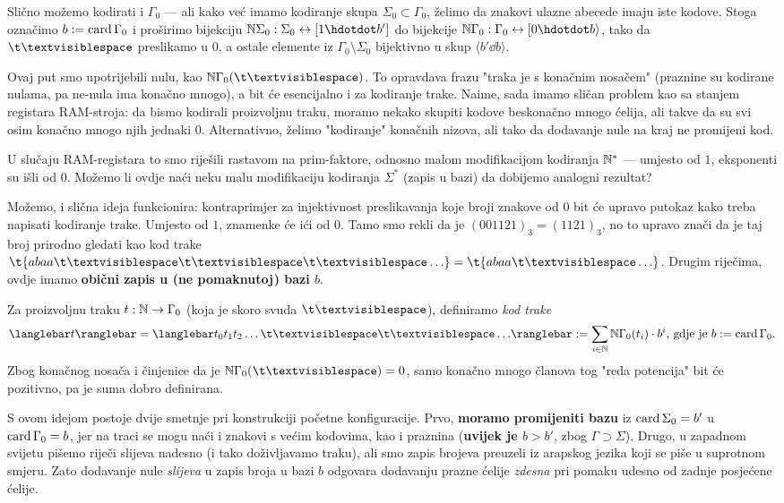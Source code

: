 Slično možemo kodirati i $\Gamma_0$ --- ali kako već imamo kodiranje skupa $\Sigma_0\subset\Gamma_0$, želimo da znakovi ulazne abecede imaju iste kodove. Stoga označimo $b:=\operatorname{card}\Gamma_0$ i proširimo bijekciju $\N\Sigma_0:\Sigma_0\leftrightarrow[1\dd b']$ do bijekcije $\N\Gamma_0:\Gamma_0\leftrightarrow[0\dd b\rangle$, tako da $\bl$ preslikamo u $0$, a ostale elemente iz $\Gamma_0\!\setminus\Sigma_0$ bijektivno u skup $\langle b'\dd b\rangle$.

Ovaj put smo upotrijebili nulu, kao $\N\Gamma_0(\bl)$. To opravdava frazu "traka je s konačnim nosačem" (praznine su kodirane nulama, pa ne-nula ima konačno mnogo), a bit će esencijalno i za kodiranje trake. Naime, sada imamo sličan problem kao sa stanjem registara RAM-stroja: da bismo kodirali proizvoljnu traku, moramo nekako skupiti kodove beskonačno mnogo ćelija, ali takve da su svi osim konačno mnogo njih jednaki $0$. Alternativno, želimo "kodiranje" konačnih nizova, ali tako da dodavanje nule na kraj ne promijeni kod.

U slučaju RAM-registara to smo riješili rastavom na prim-faktore, odnosno malom modifikacijom kodiranja ${\mathbb N}^*$ --- umjesto od $1$, eksponenti su išli od $0$. Možemo li ovdje naći neku malu modifikaciju kodiranja $\Sigma^*$ (zapis u bazi) da dobijemo analogni rezultat?

Možemo, i slična ideja funkcionira: kontraprimjer za injektivnost preslikavanja koje broji znakove od $0$ bit će upravo putokaz kako treba napisati kodiranje trake. Umjesto od $1$, znamenke će ići od $0$. Tamo smo rekli da je $(001121)_3=(1121)_3$, no to upravo znači da je taj broj prirodno gledati kao kod trake $\t{abaa\bl\bl\bl\ldots}=\t{abaa\bl\ldots}$. Drugim riječima, ovdje imamo \textbf{obični zapis u (ne pomaknutoj$\mspace{1mu}$) bazi $b$}.

\begin{definicija}[{name=[kodiranje trake Turingovog stroja]}]
Za proizvoljnu traku $t:{\mathbb N}\to\Gamma_0$ (koja je skoro svuda $\bl$), definiramo \emph{kod trake} \begin{equation}
	\knk{t}=\knk{t_0t_1t_2\ldots\bl\bl\ldots}:=\sum_{i\in\N}\N\Gamma_0(t_i)\cdot b^i\text{, gdje je $b:=\card\Gamma_0$.}
\end{equation}
	Zbog konačnog nosača i činjenice da je $\N\Gamma_0(\mspace{0.5mu}\bl)=0$, samo konačno mnogo članova tog "reda potencija" bit će pozitivno, pa je suma dobro definirana.
\end{definicija}

S ovom idejom postoje dvije smetnje pri konstrukciji početne konfiguracije. Prvo, \textbf{moramo promijeniti bazu} iz $\operatorname{card}\Sigma_0=b'$ u $\operatorname{card}\Gamma_0=b$, jer na traci se mogu naći i znakovi s većim kodovima, kao i praznina (\textbf{uvijek je $b>b'$}, zbog $\Gamma\supset\Sigma$). Drugo, u zapadnom svijetu pišemo riječi slijeva nadesno (i tako doživljavamo traku), ali smo zapis brojeva preuzeli iz arapskog jezika koji se piše u suprotnom smjeru. Zato dodavanje nule \emph{slijeva} u zapis broja u bazi $b$ odgovara dodavanju prazne ćelije \emph{zdesna} pri pomaku udesno od zadnje posjećene ćelije.

